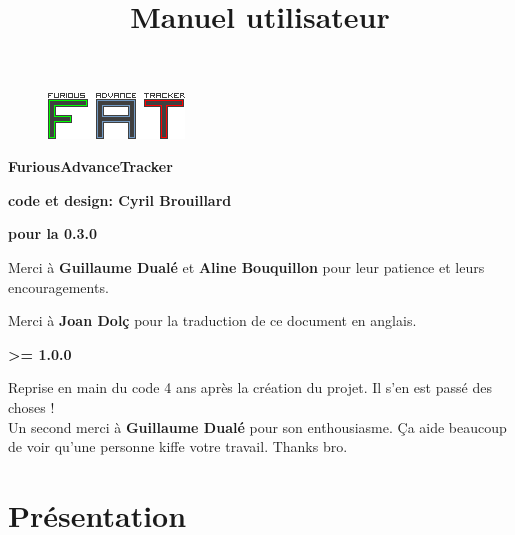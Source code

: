 \documentclass[12pt,a4paper]{article}
\title{\bf \SimpleImage{images/furicat_color}{0.3} \\ Manuel utilisateur}
\author{\fatversion}
\begin{document}
  \begin{figure}
    \begin{center}
    \includegraphics[scale=2]{images/logo}
    \end{center}
  \end{figure}
  \maketitle{}
  \thispagestyle{empty}
  \setcounter{page}{0}
  \ClearShipoutPicture

  \newpage

  \begin{center}
  
  {\bf \FAT FuriousAdvanceTracker} \medskip
  
  {\bf code et design: Cyril Brouillard} \medskip

  {\bf pour la 0.3.0} \medskip
  
  Merci à {\bf \textcolor{vert}{Guillaume Dualé}} et {\bf \textcolor{vert}{Aline Bouquillon}} pour leur patience et leurs encouragements.\medskip
  
  Merci à {\bf \textcolor{vert}{Joan Dolç}} pour la traduction de ce document en anglais. \medskip

  {\bf >= 1.0.0} \medskip

  Reprise en main du code 4 ans après la création du projet. Il s'en est passé des choses ! \\
  Un second merci à {\bf \textcolor{vert}{Guillaume Dualé}} pour son enthousiasme. Ça aide beaucoup de voir qu'une personne kiffe votre travail. Thanks bro. \\


  \end{center}
  
  \thispagestyle{empty}
  \setcounter{page}{0}
  \ClearShipoutPicture
  \newpage
  
  \tableofcontents{}
  \newpage
  
  \section{Présentation}
\end{document}
